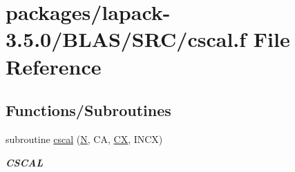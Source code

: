\hypertarget{lapack-3_85_80_2BLAS_2SRC_2cscal_8f}{}\section{packages/lapack-\/3.5.0/\+B\+L\+A\+S/\+S\+R\+C/cscal.f File Reference}
\label{lapack-3_85_80_2BLAS_2SRC_2cscal_8f}
\subsection*{Functions/\+Subroutines}
\begin{DoxyCompactItemize}
\item 
subroutine \hyperlink{group__complex__blas__level1_gab2d569bbfe6356599c69c057ecc2b3f7}{cscal} (\hyperlink{polmisc_8c_a0240ac851181b84ac374872dc5434ee4}{N}, C\+A, \hyperlink{scsum1_8c_a5a76da95c549c41790389a76e12fdcb5}{C\+X}, I\+N\+C\+X)
\begin{DoxyCompactList}\small\item\em {\bfseries C\+S\+C\+A\+L} \end{DoxyCompactList}\end{DoxyCompactItemize}
